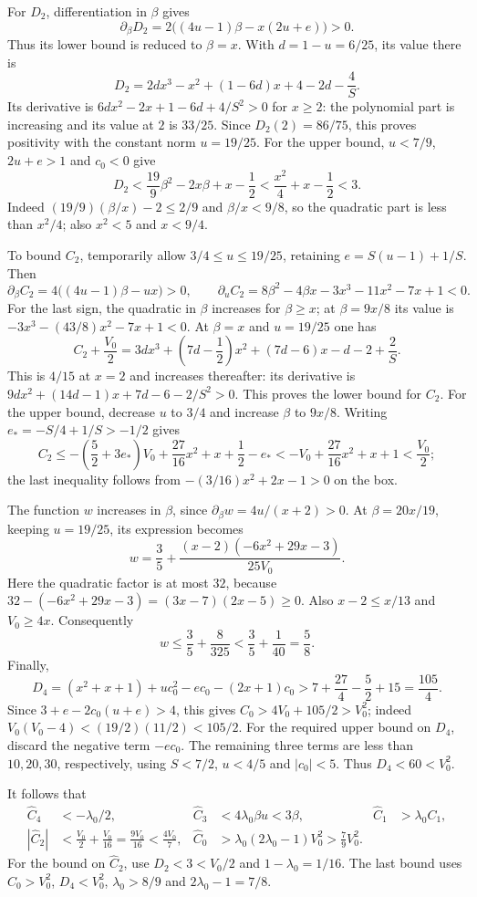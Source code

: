 For $D_2$, differentiation in $\beta$ gives
\[
 \partial_\beta D_2
 =2\bigl((4u-1)\beta-x(2u+e)\bigr)>0.
\]
Thus its lower bound is reduced to $\beta=x$. With $d=1-u=6/25$, its value there is
\[
 D_2=2dx^3-x^2+(1-6d)x+4-2d-\frac4S.
\]
Its derivative is $6dx^2-2x+1-6d+4/S^2>0$ for $x\ge2$: the polynomial part
is increasing and its value at $2$ is $33/25$. Since $D_2(2)=86/75$, this proves positivity
with the constant norm $u=19/25$.
For the upper bound, $u<7/9$, $2u+e>1$ and $c_0<0$ give
\[
 D_2<\frac{19}{9}\beta^2-2x\beta+x-\frac12
 <\frac{x^2}{4}+x-\frac12<3.
\]
Indeed $(19/9)(\beta/x)-2\le2/9$ and $\beta/x<9/8$, so the quadratic part is
less than $x^2/4$; also $x^2<5$ and $x<9/4$.

To bound $C_2$, temporarily allow $3/4\le u\le19/25$, retaining
$e=S(u-1)+1/S$. Then
\[
 \partial_\beta C_2=4\bigl((4u-1)\beta-ux\bigr)>0,
 \qquad
 \partial_u C_2=8\beta^2-4\beta x-3x^3-11x^2-7x+1<0.
\]
For the last sign, the quadratic in $\beta$ increases for $\beta\ge x$; at
$\beta=9x/8$ its value is $-3x^3-(43/8)x^2-7x+1<0$.
At $\beta=x$ and $u=19/25$ one has
\[
 C_2+\frac{V_0}{2}
 =3dx^3+\left(7d-\frac12\right)x^2+(7d-6)x-d-2+\frac2S.
\]
This is $4/15$ at $x=2$ and increases thereafter: its derivative is
$9dx^2+(14d-1)x+7d-6-2/S^2>0$. This proves the lower bound for $C_2$.
For the upper bound, decrease $u$ to $3/4$ and increase $\beta$ to $9x/8$.
Writing $e_*=-S/4+1/S>-1/2$ gives
\[
 C_2\le-\left(\frac52+3e_*\right)V_0+
          \frac{27}{16}x^2+x+\frac12-e_*
 <-V_0+\frac{27}{16}x^2+x+1<\frac{V_0}{2};
\]
the last inequality follows from
$-(3/16)x^2+2x-1>0$ on the box.

The function $w$ increases in $\beta$, since $\partial_\beta w=4u/(x+2)>0$.
At $\beta=20x/19$, keeping $u=19/25$, its expression becomes
\[
 w=\frac35+\frac{(x-2)(-6x^2+29x-3)}{25V_0}.
\]
Here the quadratic factor is at most $32$, because
$32-(-6x^2+29x-3)=(3x-7)(2x-5)\ge0$.
Also $x-2\le x/13$ and $V_0\ge4x$. Consequently
\[
 w\le\frac35+\frac8{325}<\frac35+\frac1{40}=\frac58.
\]
Finally,
\[
 D_4=(x^2+x+1)+u c_0^2-e c_0-(2x+1)c_0
 >7+\frac{27}{4}-\frac52+15=\frac{105}{4}.
\]
Since $3+e-2c_0(u+e)>4$, this gives
$C_0>4V_0+105/2>V_0^2$; indeed
$V_0(V_0-4)<(19/2)(11/2)<105/2$.
For the required upper bound on $D_4$, discard the negative term $-e c_0$.
The remaining three terms are less than $10,20,30$, respectively, using
$S<7/2$, $u<4/5$ and $|c_0|<5$. Thus $D_4<60<V_0^2$.

It follows that
\begin{align*}
 \widehat C_4&<-\lambda_0/2,&
 \widehat C_3&<4\lambda_0\beta u<3\beta,&
 \widehat C_1&>\lambda_0 C_1,\\
 |\widehat C_2|&<\frac{V_0}{2}+\frac{V_0}{16}
                =\frac{9V_0}{16}<\frac{4V_0}{7},&
 \widehat C_0&>\lambda_0(2\lambda_0-1)V_0^2>\frac79V_0^2.
\end{align*}
For the bound on $\widehat C_2$, use $D_2<3<V_0/2$ and $1-\lambda_0=1/16$.
The last bound uses $C_0>V_0^2$, $D_4<V_0^2$, $\lambda_0>8/9$ and
$2\lambda_0-1=7/8$.

